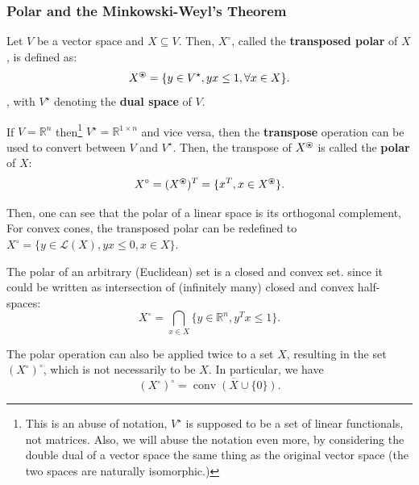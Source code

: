 \subsubsection{Polar and the Minkowski-Weyl's Theorem} %
\label{sec:Polar and the Minkowski-Weyl's Theorem}

\begin{definition}[Polar]
\label{def:Polar}
  Let \( V \) be a vector space and \( X \subseteq V \). Then,
  \( X^{\circ} \), called the \textbf{transposed polar} of \( X \), is defined as:
  \[
    X^{\ostar} = \{y \in V^{\star}, yx \le 1, \forall x \in X \}  
  .\], with \( V^{\star} \) denoting the \textbf{dual space} of \( V \).

  If \( V = \mathbb{R}^{n} \) then\footnote{This is an abuse of notation, \(
  V^{\star} \) is supposed to be a set of linear functionals, not matrices.
Also, we will abuse the notation even more, by considering the double dual of a
vector space the same thing as the original vector space (the two spaces are
naturally isomorphic.)}
  \( V^{\star} = \mathbb{R}^{1\times n} \) and
  vice versa, then the \textbf{transpose} operation can be used to convert
  between \( V \) and \( V^{\star} \). Then,
  the transpose of \( X^{\ostar} \) is called the \textbf{polar} of \( X \):
  \[
    X^{\circ} = (X^{\ostar})^{T} = \{x^{T}, x \in X^{\ostar}\}   
  .\] 
\end{definition}

Then, one can see that the polar of a linear space is its orthogonal complement,
For convex cones, the transposed polar can be redefined to \( X^{\circ} = \{y \in
\mathcal{L}(X), yx \le  0, x \in X\}   \).

The polar of an arbitrary (Euclidean) set is a closed and convex set.
since it could be written as intersection of (infinitely many) closed and convex
half-spaces:
\[
  X^{\circ} = \bigcap_{x \in X} \{y \in \mathbb{R}^{n}, y^{T}x \le  1\}  
.\] 

The polar operation can also be applied twice to a set \( X \), resulting in the
set \( (X^{\circ})^{\circ} \), which is not necessarily to be \( X \). In
particular, we have
\[
  (X^{\circ})^{\circ} = \overline{\operatorname{conv} (X \cup  \{0\}  )} 
.\] 

